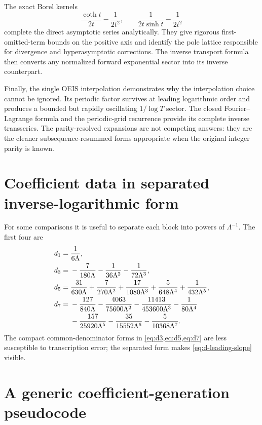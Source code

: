 \documentclass[11pt,a4paper,oneside]{article}
\theoremstyle{plain}
\theoremstyle{definition}
\theoremstyle{remark}
\begin{document}
The exact Borel kernels
\[
 \frac{\coth t}{2t}-\frac1{2t^2},
 \qquad
 \frac1{2t\sinh t}-\frac1{2t^2}
\]
complete the direct asymptotic series analytically.  They give rigorous
first-omitted-term bounds on the positive axis and identify the pole lattice
responsible for divergence and hyperasymptotic corrections.  The inverse
transport formula then converts any normalized forward exponential sector
into its inverse counterpart.

Finally, the single OEIS interpolation demonstrates why the interpolation
choice cannot be ignored.  Its periodic factor survives at leading logarithmic
order and produces a bounded but rapidly oscillating $1/\log T$ sector.  The
closed Fourier--Lagrange formula and the periodic-grid recurrence provide its
complete inverse transseries.  The parity-resolved expansions are not competing
answers: they are the cleaner subsequence-resummed forms appropriate when the
original integer parity is known.

\appendix

\section{Coefficient data in separated inverse-logarithmic form}
\label{app:separated}

For some comparisons it is useful to separate each block into powers of
$\Lambda^{-1}$.  The first four are
\begin{align}
 d_1={}&\frac1{6\Lambda},
 \notag\\
 d_3={}&-\frac7{180\Lambda}
         -\frac1{36\Lambda^2}
         -\frac1{72\Lambda^3},
 \label{eq:d3-separated}\\
 d_5={}&\frac{31}{630\Lambda}
 +\frac7{270\Lambda^2}
 +\frac{17}{1080\Lambda^3}
 +\frac5{648\Lambda^4}
 +\frac1{432\Lambda^5},
 \label{eq:d5-separated}\\
 d_7={}&-\frac{127}{840\Lambda}
 -\frac{4063}{75600\Lambda^2}
 -\frac{11413}{453600\Lambda^3}
 -\frac1{80\Lambda^4}
 \notag\\
 &-\frac{157}{25920\Lambda^5}
 -\frac{35}{15552\Lambda^6}
 -\frac5{10368\Lambda^7}.
 \label{eq:d7-separated}
\end{align}
The compact common-denominator forms in \cref{eq:d3,eq:d5,eq:d7} are less
susceptible to transcription error; the separated form makes
\cref{eq:d-leading-slope} visible.

\section{A generic coefficient-generation pseudocode}
\label{app:pseudocode}
\end{document}
